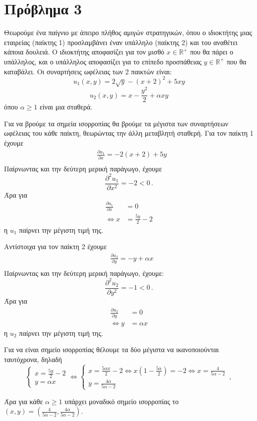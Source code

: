 \section{Πρόβλημα 3}

Θεωρούμε ένα παίγνιο με άπειρο πλήθος αμιγών στρατηγικών, όπου ο ιδιοκτήτης μιας
εταιρείας (παίκτης 1) προσλαμβάνει έναν υπάλληλο (παίκτης 2) και του αναθέτει
κάποια δουλειά. Ο ιδιοκτήτης αποφασίζει για τον μισθό $x \in \mathbb{R}^+$ που
θα πάρει ο υπάλληλος, και ο υπάλληλος αποφασίζει για το επίπεδο προσπάθειας
$y \in \mathbb{R}^+$ που θα καταβάλει. Οι συναρτήσεις ωφέλειας των 2 παικτών
είναι:
$$
    u_1(x, y) = 2\sqrt{y} - (x + 2)^2 + 5xy
$$
$$
    u_2(x, y) = x - \frac{y^2}{2} + \alpha xy
$$
όπου $\alpha \geq 1$ είναι μια σταθερά.

Για να βρούμε τα σημεία ισορροπίας θα βρούμε τα μέγιστα των συναρτήσεων ωφέλειας
του κάθε παίκτη, θεωρώντας την άλλη μεταβλητή σταθερή. Για τον παίκτη 1 έχουμε
\begin{align*}
    & \frac{\partial u_1}{\partial x} = -2(x + 2) + 5y \\
\end{align*}
Παίρνωντας και την δεύτερη μερική παράγωγο, έχουμε
$$
    \frac{\partial^2 u_1}{\partial x^2} = -2 < 0 \,.
$$
Άρα για
\begin{align*}
    \frac{\partial u_1}{\partial x} &= 0 \\
    \Leftrightarrow x &= \frac{5y}{2} - 2
\end{align*}
η $u_1$ παίρνει την μέγιστη τιμή της.

Αντίστοιχα για τον παίκτη 2 έχουμε
\begin{align*}
    & \frac{\partial u_2}{\partial y} = - y + \alpha x \\
\end{align*}
Παίρνωντας και την δεύτερη μερική παράγωγο, έχουμε:
$$
    \frac{\partial^2 u_2}{\partial y^2} = -1 < 0 \,.
$$
Άρα για
\begin{align*}
    \frac{\partial u_2}{\partial y} &= 0 \\
    \Leftrightarrow y &= \alpha x
\end{align*}
η $u_2$ παίρνει την μέγιστη τιμή της.

Για να είναι σημείο ισορροπίας θέλουμε τα δύο μέγιστα να ικανοποιούνται
ταυτόχρονα, δηλαδή
$$
\begin{cases}
    x = \frac{5y}{2} - 2 \\
    y = \alpha x
\end{cases}
\Leftrightarrow
\begin{cases}
    x = \frac{5\alpha x}{2} - 2 \Leftrightarrow x(1-\frac{5 \alpha}{2}) = -2
    \Leftrightarrow x = \frac{4}{5\alpha - 2} \\
    y = \frac{4 \alpha}{5\alpha - 2}
\end{cases}
\,,
$$

Άρα για κάθε $\alpha \geq 1$ υπάρχει μοναδικό σημείο ισορροπίας το
$(x, y) = (\frac{4}{5\alpha - 2}, \frac{4 \alpha}{5\alpha - 2})$.